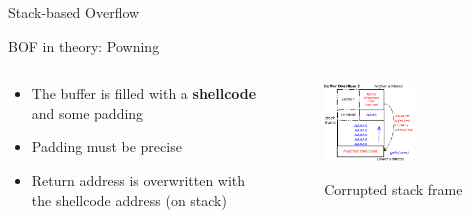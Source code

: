 \begin{frame}{Stack-based Overflow}
\framebreak

\begin{block}{BOF in theory: Powning}
\begin{columns}[T]
	\begin{column}{.3\textwidth}
	\begin{itemize}
	\item The buffer is filled with a 
		  {\bf shellcode} and some padding
	\item Padding must be precise
	\item Return address is overwritten with 
	      the shellcode address (on stack)
	\end{itemize}
    \end{column}
	\begin{column}{.7\textwidth}
	\begin{figure}
    \includegraphics[width=0.6\textwidth]{imgs/bof2.png}
    \label{fig:bof2}
    \caption{Corrupted stack frame}
    \end{figure}	
	\end{column}
\end{columns}	
\end{block}

\framebreak


\end{frame}
